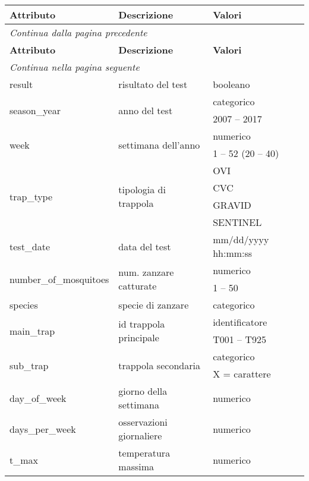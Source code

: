 \begin{longtable}{lll}
	\toprule
	\textbf{Attributo} \quad & \textbf{Descrizione} & \textbf{Valori} \\
	\midrule
	\endfirsthead
	\multicolumn{3}{l}{\footnotesize\itshape Continua dalla pagina precedente} 
	\\
	\toprule
	\textbf{Attributo} \quad & \textbf{Descrizione} & \textbf{Valori} 
	\\			
	\endhead
	\multicolumn{3}{l}{\footnotesize\itshape Continua nella pagina 
		seguente} \\
	\endfoot
	\endlastfoot
	
	result	& risultato del test  &	booleano \\\hline
	\multirow{2}{*}{season\_year} & \multirow{2}{*}{anno del test} &  
	categorico \\
	& &{2007} -- {2017}       	\\ \hline
	\multirow{2}{*}{week}					&\multirow{2}{*}{settimana 
		dell'anno}  & numerico    \\ 
	& & {1} -- {52} ({20} -- {40})\\\hline
	\multirow{4}{*}{trap\_type}				& \multirow{4}{*}{tipologia di 
		trappola} &     OVI\\
	&& CVC\\
	&& GRAVID\\
	&& SENTINEL\\\hline
	{test\_date}	&{data del test}   &   mm/dd/yyyy hh:mm:ss \\\hline
	\multirow{2}{*}{number\_of\_mosquitoes}	& \multirow{2}{*}{num. zanzare 
		catturate} &  numerico        	\\ 
	& & {1} -- {50} \\ \hline
	species & specie di zanzare	 &	categorico\\	\hline	
	\multirow{2}{*}{main\_trap}	&\multirow{2}{*}{id trappola principale} 
	&  	identificatore        	\\ 
	& & T001 -- T925\\\hline
	\multirow{2}{*}{sub\_trap}	&\multirow{2}{*}{trappola 
		secondaria} &  categorico        	\\ 
	&& X = carattere\\\hline
	{day\_of\_week}	& {giorno della 
		settimana} &  numerico  \\\hline
	days\_per\_week & {osservazioni giornaliere}	& numerico \\ \hline
	\multirow{2}{*}{t\_max}	& temperatura massima & \multirow{2}{*}{numerico}\\

\end{longtable}
